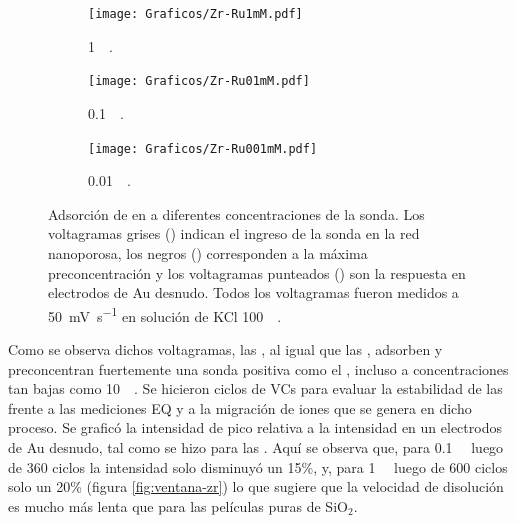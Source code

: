 	 			\begin{figure}[th]
			   	    \begin{subfigure}[t]{0.325\textwidth}
			        	\texttt{[image: Graficos/Zr-Ru1mM.pdf]}
			        	\vspace*{-0.40cm}\caption{\aminorutenio\space \SI{1}{\milli\Molar}.}
			         	\label{fig:Zr-Ru1mM}
			     		\end{subfigure}
			   	    \begin{subfigure}[t]{0.325\textwidth}
			        	\texttt{[image: Graficos/Zr-Ru01mM.pdf]}
			       		\vspace*{-0.40cm}\caption{\aminorutenio\space \SI{0.1}{\milli\Molar}.}
			         	\label{fig:Zr-Ru0.1mM}
			     		\end{subfigure}
		     		\begin{subfigure}[t]{0.325\textwidth}
			        	\texttt{[image: Graficos/Zr-Ru001mM.pdf]}
			       		\vspace*{-0.40cm}\caption{\aminorutenio\space \SI{0.01}{\milli\Molar}.}
			         	\label{fig:Zr-Ru0.01mM}
			     		\end{subfigure}
			     		\caption[Preconcentración de \aminorutenio\space en \pdmZ]{Adsorción de \ru\space en \pdmZ\space a diferentes concentraciones de la sonda. Los voltagramas grises (\usebox{\gris}) indican el ingreso de la sonda en la red nanoporosa, los negros (\usebox{\negro}) corresponden a la máxima preconcentración y los voltagramas punteados (\usebox{\punteado}) son la respuesta en electrodos de Au desnudo. Todos los voltagramas fueron medidos a \SI{50}{\milli\volt\per\second} en solución de KCl \SI{100}{\milli\Molar}.}
			     		\label{fig:precon_ZR}
		     		\end{figure}
		 
		 Como se observa dichos voltagramas, las \pdmZ, al igual que las \pdmF, adsorben y preconcentran fuertemente una sonda positiva como el \ru,	incluso a concentraciones tan bajas como \SI{10}{\micro\Molar}. Se hicieron ciclos de VCs para evaluar la estabilidad de las \pdmZ\space frente a las mediciones EQ y a la migración de iones que se genera en dicho proceso. Se graficó la intensidad de pico relativa a la intensidad en un electrodos de Au desnudo, tal como se hizo para las \pdmF. Aquí se observa que, para \ru\space \SI{0.1}{\milli\Molar} luego de 360 ciclos la intensidad solo disminuyó un 15\%, y, para \ru\space \SI{1}{\milli\Molar} luego de 600 ciclos solo un 20\% (figura \ref{fig:ventana-zr}) lo que sugiere que la velocidad de disolución es mucho más lenta que para las películas puras de SiO$_2$.

